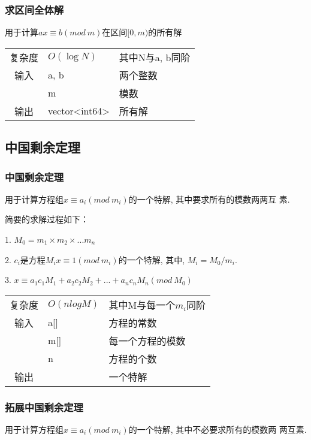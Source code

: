         \subsubsection{求区间全体解}\small
用于计算$ax \equiv b(mod\ m)$在区间$[0, m)$的所有解
\begin{longtable}{|c|l|l|}
复杂度 & $O(\log N)$ & 其中N与a, b同阶  \\
输入 & a, b & 两个整数 \\
 & m & 模数 \\
输出 & vector<int64> & 所有解 \\
\end{longtable}



    \subsection{中国剩余定理}\small


        \subsubsection{中国剩余定理}\small
用于计算方程组$x \equiv a_i(mod\ m_i)$的一个特解, 其中要求所有的模数两两互
素.

简要的求解过程如下：

1. $M_0 = m_1 \times m_2 \times ... m_n$

2. $c_i$是方程$M_ix \equiv 1(mod\ m_i)$的一个特解, 其中, $M_i = M_0 / m_i$.

3. $x \equiv a_1c_1M_1 + a_2c_2M_2 + ... + a_nc_nM_n (mod\ M_0)$

\begin{longtable}{|c|l|l|}
复杂度 & $O(nlogM)$ & 其中M与每一个$m_i$同阶 \\
输入 & a[] & 方程的常数 \\
 & m[] & 每一个方程的模数 \\
 & n & 方程的个数 \\
输出 & & 一个特解 \\
\end{longtable}



        \subsubsection{拓展中国剩余定理}\small
用于计算方程组$x \equiv a_i(mod\ m_i)$的一个特解, 其中不必要求所有的模数两
两互素.

